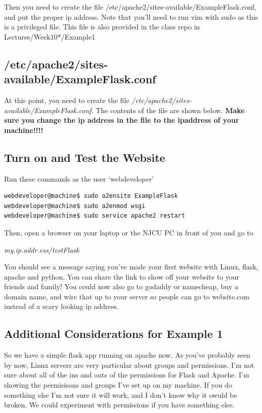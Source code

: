 \documentclass[10pt]{article}
\begin{document}
Then you need to create the file /etc/apache2/sites-available/ExampleFlask.conf, and put the proper ip address. Note that
you'll need to run vim with sudo as this is a privileged file. This file is also
provided in the class repo in Lectures/Week10*/Example1

\subsection{/etc/apache2/sites-available/ExampleFlask.conf}
At this point, you need to create the file
\textit{/etc/apache2/sites-available/ExampleFlask.conf}. The contents of the
file are shown below. \textbf{Make sure you change the ip address in the file to the
ipaddress of your machine!!!!}



\subsection{Turn on and Test the Website}
Run these commands as the user `webdeveloper'
\begin{lstlisting}[style=term]
webdeveloper@machine$ sudo a2ensite ExampleFlask
webdeveloper@machine$ sudo a2enmod wsgi
webdeveloper@machine$ sudo service apache2 restart
\end{lstlisting}

Then, open a browser on your laptop or the NJCU PC in front of you and go to 

\begin{center}
\textit{my.ip.addr.ess/testFlask}
\end{center}

You should see a message saying you've made your first website with Linux, flask, apache and python. You can share the link to show off your website to your friends and family! You could now also go to godaddy or namecheap, buy a domain name, and wire that up to your server so people can go to website.com instead of a scary looking ip address.

\subsection{Additional Considerations for Example 1}
So we have a simple flask app running on apache now. As you've probably seen by now, Linux servers are very particular about groups and permissions. I'm not sure about all of the ins and outs of the permissions for Flask and Apache. I'm showing the permisisons and groups I've set up on my machine. If you do something else I'm not sure it will work, and I don't know why it owuld be broken. We could experiment with permissions if you have something else.
\end{document}
